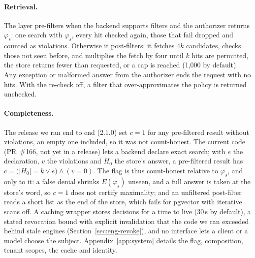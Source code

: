 \paragraph{Retrieval.}
The layer pre-filters when the backend supports filters and the authorizer returns $\varphi_s$: one search with
$\varphi_s$, every hit checked again, those that fail dropped and counted as violations. Otherwise it post-filters: it
fetches $4k$ candidates, checks those not seen before, and multiplies the fetch by four until $k$ hits are permitted, the
store returns fewer than requested, or a cap is reached (1,000 by default). Any exception or malformed answer from the
authorizer ends the request with no hits. With the re-check off, a filter that over-approximates the policy is returned
unchecked.

\paragraph{Completeness.}
The release we ran end to end (2.1.0) set $c = 1$ for any pre-filtered result without violations, an
empty one included, so it was not count-honest. The current code (PR~\#166, not yet in a release) lets a
backend declare exact search; with $e$ the declaration, $v$ the violations and $H_0$ the store's answer,
a pre-filtered result has $c = \bigl(|H_0| = k \vee e\bigr) \wedge (v = 0)$. The flag is thus count-honest
relative to $\varphi_s$, and only to it: a false denial shrinks $E(\varphi_s)$ unseen, and a full answer is
taken at the store's word, so $c = 1$ does not certify maximality; and an unfiltered post-filter reads a short list as the end of the store, which fails for pgvector with iterative scans off. A caching wrapper stores decisions for a
time to live (30\,s by default), a stated revocation bound with explicit invalidation that the code we ran exceeded
behind stale engines (Section~\ref{sec:eng-revoke}), and no interface lets a client or a model choose the subject.
Appendix~\ref{app:system} details the flag, composition, tenant scopes, the cache and identity.
